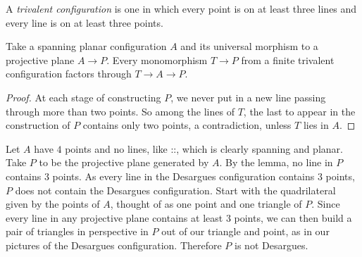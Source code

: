 A \emph{trivalent configuration} is one in which every point is on at least three lines and every line is on at least three points.
\begin{lemma}
Take a spanning planar configuration \(A\) and its universal morphism to a projective plane \(A \to P\).
Every monomorphism \(T \to P\) from a finite trivalent configuration factors through \(T \to A \to P\).
\end{lemma}
\begin{proof}
At each stage of constructing \(P\), we never put in a new line passing through more than two points.
So among the lines of \(T\), the last to appear in the construction of \(P\) contains only two points, a contradiction, unless \(T\) lies in \(A\).
\end{proof}
\begin{example}
Let \(A\) have \(4\) points and no lines, like ::, which is clearly spanning and planar. 
Take \(P\) to be the projective plane generated by \(A\).
By the lemma, no line in \(P\) contains \(3\) points.
As every line in the Desargues configuration contains \(3\) points, \(P\) does not contain the Desargues configuration.
Start with the quadrilateral given by the points of \(A\), thought of as one point and one triangle of \(P\).
Since every line in any projective plane contains at least \(3\) points, we can then build a pair of triangles in perspective in \(P\) out of our triangle and point, as in our pictures of the Desargues configuration.
Therefore \(P\) is not Desargues. 
\end{example}

